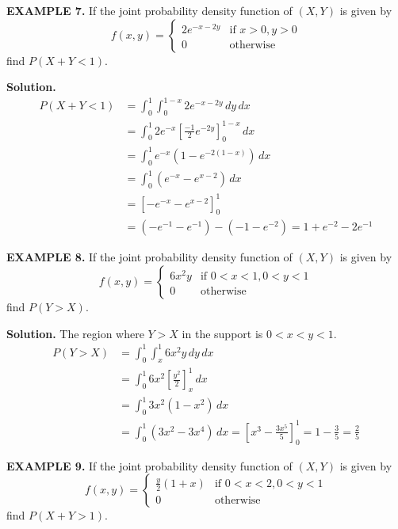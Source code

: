 \documentclass{article}
\begin{document}
\vspace{1em}

\textbf{EXAMPLE 7.} If the joint probability density function of $(X,Y)$ is given by
$$
f(x, y) = \begin{cases} 2e^{-x-2y} & \text{if } x > 0, y > 0 \\ 0 & \text{otherwise} \end{cases}
$$
find $P(X +Y < 1)$.

\textbf{Solution.}
\begin{align*}
P(X+Y < 1) &= \int_{0}^{1} \int_{0}^{1-x} 2e^{-x-2y} \,dy \,dx \\
&= \int_{0}^{1} 2e^{-x} \left[ \frac{-1}{2} e^{-2y} \right]_{0}^{1-x} \,dx \\
&= \int_{0}^{1} e^{-x} (1 - e^{-2(1-x)}) \,dx \\
&= \int_{0}^{1} (e^{-x} - e^{x-2}) \,dx \\
&= \left[ -e^{-x} - e^{x-2} \right]_{0}^{1} \\
&= (-e^{-1} - e^{-1}) - (-1 - e^{-2}) = 1 + e^{-2} - 2e^{-1}
\end{align*}

\vspace{1em}

\textbf{EXAMPLE 8.} If the joint probability density function of $(X,Y)$ is given by
$$
f(x, y) = \begin{cases} 6x^2y & \text{if } 0 < x < 1, 0 < y < 1 \\ 0 & \text{otherwise} \end{cases}
$$
find $P(Y > X)$.

\textbf{Solution.} The region where $Y > X$ in the support is $0 < x < y < 1$.
\begin{align*}
P(Y > X) &= \int_{0}^{1} \int_{x}^{1} 6x^2y \,dy \,dx \\
&= \int_{0}^{1} 6x^2 \left[ \frac{y^2}{2} \right]_{x}^{1} \,dx \\
&= \int_{0}^{1} 3x^2 (1 - x^2) \,dx \\
&= \int_{0}^{1} (3x^2 - 3x^4) \,dx = \left[ x^3 - \frac{3x^5}{5} \right]_{0}^{1} = 1 - \frac{3}{5} = \frac{2}{5}
\end{align*}

\vspace{1em}

\textbf{EXAMPLE 9.} If the joint probability density function of $(X,Y)$ is given by
$$
f(x, y) = \begin{cases} \frac{y}{2}(1+x) & \text{if } 0 < x < 2, 0 < y < 1 \\ 0 & \text{otherwise} \end{cases}
$$
find $P(X +Y > 1)$.
\end{document}
